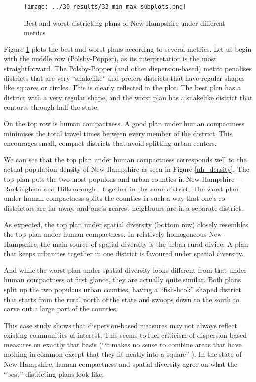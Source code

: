 \documentclass[]{article}
\begin{document}
\begin{figure}
\centering
\texttt{[image: ../30\_results/33\_min\_max\_subplots.png]}
\caption{Best and worst districting plans of New Hampshire under
different metrics \label{nh_minmax}}
\end{figure}

Figure \ref{nh_minmax} plots the best and worst plans according to
several metrics. Let us begin with the middle row (Polsby-Popper), as
its interpretation is the most straightforward. The Polsby-Popper (and
other dispersion-based) metric penalises districts that are very
``snakelike'' and prefers districts that have regular shapes like
squares or circles. This is clearly reflected in the plot. The best plan
has a district with a very regular shape, and the worst plan has a
snakelike district that contorts through half the state.

On the top row is human compactness. A good plan under human compactness
minimises the total travel times between every member of the district.
This encourages small, compact districts that avoid splitting urban
centers.

We can see that the top plan under human compactness corresponds well to
the actual population density of New Hampshire as seen in Figure
\ref{nh_density}. The top plan puts the two most populous and urban
counties in New Hampshire---Rockingham and Hillsborough---together in
the same district. The worst plan under human compactness splits the
counties in such a way that one's co-districtors are far away, and one's
nearest neighbours are in a separate district.

As expected, the top plan under spatial diversity (bottom row) closely
resembles the top plan under human compactness. In relatively
homogeneous New Hampshire, the main source of spatial diversity is the
urban-rural divide. A plan that keeps urbanites together in one district
is favoured under spatial diversity.

And while the worst plan under spatial diversity looks different from
that under human compactness at first glance, they are actually quite
similar. Both plans split up the two populous urban counties, having a
``fish-hook'' shaped district that starts from the rural north of the
state and swoops down to the south to carve out a large part of the
counties.

This case study shows that dispersion-based measures may not always
reflect existing communities of interest. This seems to fuel criticism
of dispersion-based measures on exactly that basis (``it makes no sense
to combine areas that have nothing in common except that they fit neatly
into a square'' \citep{wolf2015}). In the state of New Hampshire, human
compactness and spatial diversity agree on what the ``best'' districting
plans look like.
\end{document}
